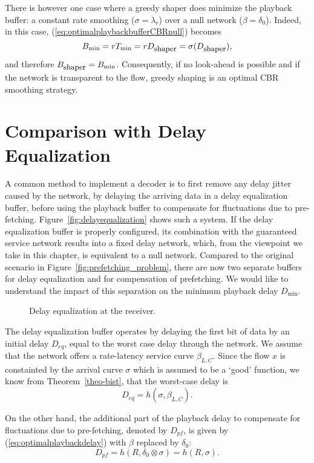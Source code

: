 There is however one case where a greedy shaper does minimize the playback buffer: a constant rate smoothing ($\sigma = \lambda_r$) over a null network ($\beta=\delta_0$). Indeed, in this case, (\ref{eq:optimalplaybackbufferCBRnull}) becomes
$$ B_{\min} = rT_{\min} = rD_{\mbox{\small shaper}} =  \sigma(D_{\mbox{\small shaper}}), $$
and therefore $B_{\mbox{\small shaper}} =   B_{\min}$. Consequently, if no look-ahead is possible and if the network is transparent to the flow, greedy shaping is an optimal CBR smoothing strategy.



\section{Comparison with Delay Equalization}

A common method to implement a decoder is to first remove any delay jitter caused by the network, by delaying the arriving data in a delay equalization buffer, before using the playback buffer to compensate for fluctuations due to pre-fetching. Figure~\ref{fig:delayequalization} shows such a system. If the delay equalization buffer is properly configured, its combination with the guaranteed service network results into a fixed delay network, which, from the viewpoint we take in this chapter, is equivalent to a null network. Compared to the original scenario in Figure~\ref{fig:prefetching_problem}, there are now two separate buffers for delay equalization and for compensation of prefetching. We would like to understand the impact of this separation on the minimum playback delay $D_{\min}$.

\begin{figure}[h!]
\caption{Delay equalization at the receiver.}
\end{figure}

The delay equalization buffer operates by delaying the first bit of data by an initial delay $D_{eq}$, equal to the worst case delay through the network. We assume that the network offers a rate-latency service curve $\beta_{L,C}$. Since the flow $x$ is constainted by the arrival curve $\sigma$ which is assumed to be a `good' function, we know from Theorem~\ref{theo-bist}, that the worst-case delay is
$$ D_{eq} = h( \sigma, \beta_{L,C}). $$

On the other hand, the additional part of the playback delay to compensate for fluctuations due to pre-fetching, denoted by $D_{pf}$, is given by (\ref{eq:optimalplaybackdelay}) with $\beta$ replaced by $\delta_0$:
$$ D_{pf} =  h(R, \delta_0 \otimes \sigma) = h(R, \sigma). $$

